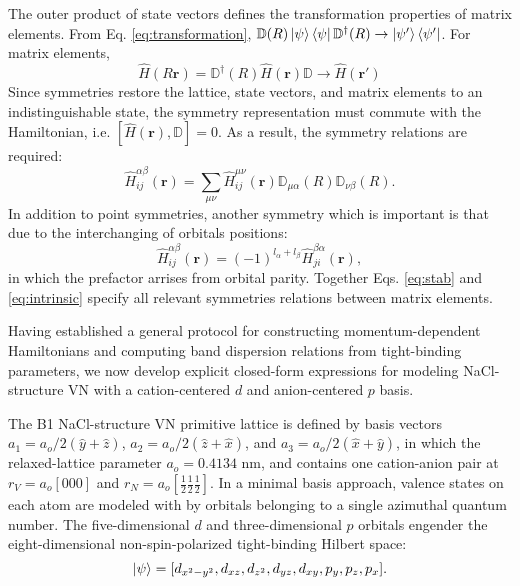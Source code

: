 \documentclass[twocolumn,showpacs,preprintnumbers,superscriptaddress,prb,floatfix,aps,10pt]{revtex4-1}
\renewcommand{\vec}[1]{\ensuremath{\mathbf{#1}}}
\newcommand*{\ham}{\hat{H}}
\newcommand*{\wignerD}{\mathbb{D}}%
\begin{document}
The outer product of state vectors defines the transformation properties of matrix elements. From Eq. \ref{eq:transformation}, $ \mathbb{D}(R)\ket{\psi}\bra{\psi}\mathbb{D}^\dag(R) \rightarrow \ket{\psi'}\bra{\psi'}$. For matrix elements, \cite{el-batanouny_symmetry_2008}
\begin{equation}
\label{eq:transformation_matrix}
\ham( R\vec{r}) = \mathbb{D}^\dag(R) \ham(\vec{r}) \wignerD \rightarrow \ham(\vec{r}')
\end{equation}
%
Since symmetries restore the lattice, state vectors, and matrix elements to an indistinguishable state, the symmetry representation must commute with the Hamiltonian, i.e. $[\ham(\vec{r}),\wignerD] = 0$. As a result, the symmetry relations are required:
\begin{equation}
\label{eq:stab}
\ham^{\alpha\beta}_{ij}(\vec{r}) = \sum_{\mu\nu} \ham^{\mu\nu}_{ij}(\vec{r}) \mathbb{D}_{\mu\alpha}(R) \mathbb{D}_{\nu\beta}(R).
\end{equation}
%
In addition to point symmetries, another symmetry which is important is that due to the interchanging of orbitals positions:
%
\begin{equation}
\label{eq:intrinsic}
\ham^{\alpha\beta}_{ij}(\vec{r}) = (-1)^{l_\alpha+l_\beta} \ham^{\beta\alpha}_{ji}(\vec{r}),
\end{equation}
%
in which the prefactor arrises from orbital parity. Together Eqs. \ref{eq:stab} and \ref{eq:intrinsic} specify all relevant symmetries relations between matrix elements.









 







Having established a general protocol for constructing momentum-dependent Hamiltonians and computing band dispersion relations from tight-binding parameters, we now develop explicit closed-form expressions for modeling NaCl-structure VN with a cation-centered $d$ and anion-centered $p$ basis. 

The B1 NaCl-structure VN primitive lattice is defined by basis vectors $a_1 = a_o/2 (\hat{y} + \hat{z})$, $a_2 = a_o/2 (\hat{z} + \hat{x})$, and $a_3 = a_o/2 (\hat{x} + \hat{y})$, in which the relaxed-lattice parameter $a_o = 0.4134$ nm, and contains one cation-anion pair at $r_V = a_o[000]$ and $r_N = a_o[\frac{1}{2}\frac{1}{2}\frac{1}{2}]$. In a minimal basis approach, valence states on each atom are modeled with by orbitals belonging to a single azimuthal quantum number. The five-dimensional $d$ and three-dimensional $p$ orbitals engender the eight-dimensional non-spin-polarized tight-binding Hilbert space:
\begin{equation}
\label{eq:hilbert}
\ket{\psi} =
[ d_{x^2-y^2},
  d_{xz},
  d_{z^2}, 
  d_{yz},
  d_{xy},
  p_{y},
  p_{z},
  p_{x}] .
\end{equation}
\end{document}
